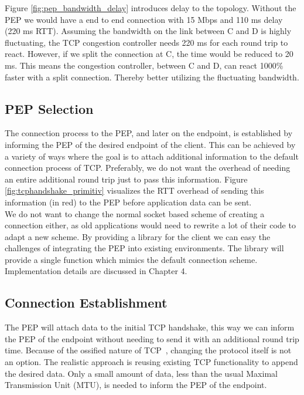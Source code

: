 \documentclass[a4paper,english, 11pt]{report}
\begin{document}
Figure \ref{fig:pep_bandwidth_delay} introduces delay to the topology. Without the PEP we would have a end to end connection with 15 Mbps and 110 ms delay (220 ms RTT). Assuming the bandwidth on the link between C and D is highly fluctuating, the TCP congestion controller needs 220 ms for each round trip to react. However, if we split the connection at C, the time would be reduced to 20 ms. This means the congestion controller, between C and D, can react 1000\% faster with a split connection. Thereby better utilizing the fluctuating bandwidth.
 
\subsection{PEP Selection}
The connection process to the PEP, and later on the endpoint, is established by informing the PEP of the desired endpoint of the client. This can be achieved by a variety of ways where the goal is to attach additional information to the default connection process of TCP. Preferably, we do not want the overhead of needing an entire additional round trip just to pass this information. Figure \ref{fig:tcphandshake_primitiv} visualizes the RTT overhead of sending this information (in red) to the PEP before application data can be sent.\\

We do not want to change the normal socket based scheme of creating a connection either, as old applications would need to rewrite a lot of their code to adapt a new scheme. By providing a library for the client we can easy the challenges of integrating the PEP into existing environments. The library will provide a single function which mimics the default connection scheme. Implementation details are discussed in Chapter 4.

\subsection{Connection Establishment}  
The PEP will attach data to the initial TCP handshake, this way we can inform the PEP of the endpoint without needing to send it with an additional round trip time. Because of the ossified nature of TCP~\cite{tcp_extendable}, changing the protocol itself is not an option. The realistic approach is reusing existing TCP functionality to append the desired data. Only a small amount of data, less than the usual Maximal Transmission Unit (MTU), is needed to inform the PEP of the endpoint. \\
\end{document}
